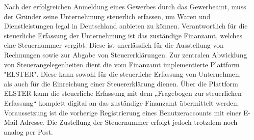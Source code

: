 Nach der erfolgreichen Anmeldung eines Gewerbes durch das Gewerbeamt, muss der Gründer seine Unternehmung steuerlich erfassen, um Waren und Dienstleistungen legal in Deutschland anbieten zu können. Verantwortlich für die steuerliche Erfassung der Unternehmung ist das zuständige Finanzamt, welches eine Steuernummer vergibt. Diese ist unerlässlich für die Ausstellung von Rechnungen sowie zur Abgabe von Steuererklärungen. 
Zur zentralen Abwicklung von Steuerangelegenheiten dient die vom Finanzamt implementierte Plattform "ELSTER". Diese kann sowohl für die steuerliche Erfassung von Unternehmen, als auch für die Einreichung einer Steuererklärung dienen. Über die Plattform ELSTER kann die steuerliche Erfassung mit dem „Fragebogen zur steuerlichen Erfassung“ komplett digital an das zuständige Finanzamt übermittelt werden, Voraussetzung ist die vorherige Registrierung eines Benutzeraccounts mit einer E-Mail-Adresse. Die Zustellung der Steuernummer erfolgt jedoch trotzdem noch analog per Post.
